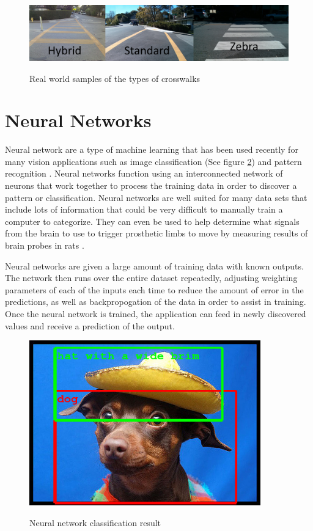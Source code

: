 \documentclass[12pt]{ucthesis}
\newcommand{\captionfonts}{\small\bf\ssp}
\begin{document}
\begin{figure}[h]
\begin{center}
\includegraphics[width=13cm]{All3Types.jpg}
\captionfonts
\caption[This is a figure]{Real world samples of the types of crosswalks}
\label{fig:TypesOfXwalksRealFig}
\end{center}
\end{figure}

\section{Neural Networks}
Neural network are a type of machine learning that has been used recently for many vision applications such as image classification (See figure \ref{fig:DogWithHat}) and pattern recognition \cite{christianszegedy2014}. Neural networks function using an interconnected network of neurons that work together to process the training data in order to discover a pattern or classification. Neural networks are well suited for many data sets that include lots of information that could be very difficult to manually train a computer to categorize. They can even be used to help determine what signals from the brain to use to trigger prosthetic limbs to move by measuring results of brain probes in rats \cite{ratNeural}.

Neural networks are given a large amount of training data with known outputs. The network then runs over the entire dataset repeatedly, adjusting weighting parameters of each of the inputs each time to reduce the amount of error in the predictions, as well as backpropogation of the data in order to assist in training. Once the neural network is trained, the application can feed in newly discovered values and receive a prediction of the output.  


\begin{figure}[h]
\begin{center}
\includegraphics[width=10cm]{DogWithHat.PNG}
\captionfonts
\caption[This is a figure]{Neural network classification result\cite{christianszegedy2014}}
\label{fig:DogWithHat}
\end{center}
\end{figure}
\end{document}
